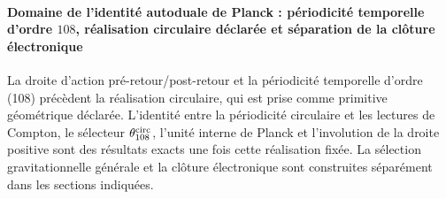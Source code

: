 \paragraph{Domaine de l'identité autoduale de Planck : périodicité temporelle d'ordre \(108\), réalisation circulaire déclarée et séparation de la clôture électronique}
La droite d'action pré-retour/post-retour et la périodicité temporelle
d'ordre (108) précèdent la réalisation circulaire, qui est prise comme primitive
géométrique déclarée. L'identité entre la périodicité
circulaire et les lectures de Compton, le
sélecteur \(\theta_{108}^{\rm circ}\), l'unité interne de Planck et
l'involution de la droite positive sont des résultats exacts une fois cette
réalisation fixée. La sélection gravitationnelle générale et la clôture électronique
sont construites séparément dans les sections indiquées.
